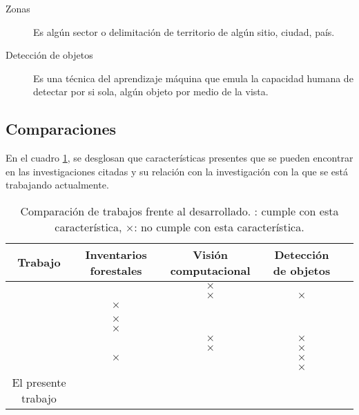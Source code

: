 \begin{description}
\item[Zonas]{Es algún sector o delimitación de territorio de algún sitio, ciudad, país.}
\end{description}

\begin{description}
\item[Detección de objetos]{Es una técnica del aprendizaje máquina que emula la capacidad humana de detectar por si sola, algún objeto por medio de la vista.}
\end{description}

\newpage

\subsection{Comparaciones}
En el cuadro \ref{tab:Comparación de trabajos frente al desarrollado}, se desglosan que características presentes  que se pueden encontrar en las investigaciones citadas y su relación con la investigación con la que se está trabajando actualmente.\\
\renewcommand{\tablename}{Cuadro}
\begin{table}[hbt!]
	{\centering
	\caption{Comparación de trabajos frente al desarrollado. \checkmark: cumple con esta característica, $\times$: no cumple con esta característica.}
	\begin{adjustbox}{width=\textwidth}
		\begin{tabular}{|c|c|c|c|c|}
			\hline
			Trabajo &  Inventarios forestales &  Visión computacional & Detección de objetos\\
			\hline
			\citet{rf1} & \checkmark & $\times$ & \checkmark \\
			\hline
			\citet{rf2}&  \checkmark  &  $\times$ & $\times$  \\
			\hline
			\citet{rf3}& $\times$ & \checkmark & \checkmark  \\
			\hline	
			\citet{rf9}& \checkmark & \checkmark & \checkmark  \\
			\hline
			\citet{rf10}& $\times$ & \checkmark & \checkmark  \\
			\hline
			\citet{rf11}& $\times$ & \checkmark & \checkmark  \\
			\hline
			\citet{rf12}& \checkmark  & $\times$ & $\times$  \\
			\hline
			\citet{rf13}& \checkmark & $\times$ & $\times$  \\
			\hline
			\citet{rf14}&  $\times$ & \checkmark & $\times$   \\
			\hline
			\citet{rf15}& \checkmark & \checkmark & $\times$  \\
			\hline
			El presente trabajo & \checkmark & \checkmark & \checkmark \\
			\hline
		\end{tabular}
	\end{adjustbox}
	\label{tab:Comparación de trabajos frente al desarrollado}}
\end{table}

